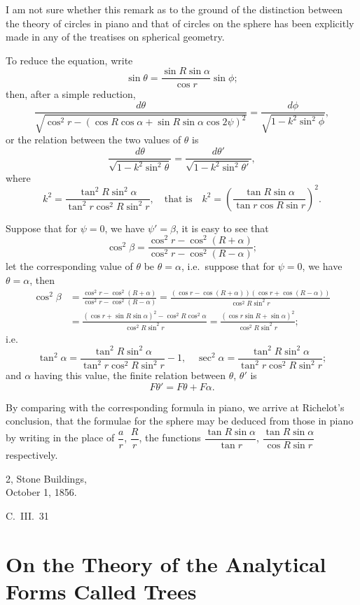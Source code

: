 \documentclass[11pt,a4paper]{article}
\theoremstyle{plain}
\begin{document}
I am not sure whether this remark as to the ground of the distinction between the theory of circles in piano and that of circles on the sphere has been explicitly made in any of the treatises on spherical geometry.

To reduce the equation, write
\[
\sin\theta = \frac{\sin R \sin\alpha}{\cos r} \sin\phi;
\]
then, after a simple reduction,
\[
\frac{d\theta}{\sqrt{\cos^2 r - (\cos R \cos\alpha + \sin R \sin\alpha \cos 2\psi)^2}} = \frac{d\phi}{\sqrt{1 - k^2\sin^2\phi}},
\]
or the relation between the two values of $\theta$ is
\[
\frac{d\theta}{\sqrt{1 - k^2\sin^2\theta}} = \frac{d\theta'}{\sqrt{1 - k^2\sin^2\theta'}},
\]
where
\[
k^2 = \frac{\tan^2 R \sin^2\alpha}{\tan^2 r \cos^2 R \sin^2 r}, \quad \text{that is} \quad k^2 = \left(\frac{\tan R \sin\alpha}{\tan r \cos R \sin r}\right)^2.
\]

Suppose that for $\psi = 0$, we have $\psi' = \beta$, it is easy to see that
\[
\cos^2\beta = \frac{\cos^2 r - \cos^2(R+\alpha)}{\cos^2 r - \cos^2(R-\alpha)};
\]
let the corresponding value of $\theta$ be $\theta = \alpha$, i.e.\ suppose that for $\psi = 0$, we have $\theta = \alpha$, then
\begin{align*}
\cos^2\beta &= \frac{\cos^2 r - \cos^2(R+\alpha)}{\cos^2 r - \cos^2(R-\alpha)} = \frac{(\cos r - \cos(R+\alpha))(\cos r + \cos(R-\alpha))}{\cos^2 R \sin^2 r} \\
&= \frac{(\cos r + \sin R \sin\alpha)^2 - \cos^2 R \cos^2\alpha}{\cos^2 R \sin^2 r} = \frac{(\cos r \sin R + \sin\alpha)^2}{\cos^2 R \sin^2 r};
\end{align*}
i.e.
\[
\tan^2\alpha = \frac{\tan^2 R \sin^2\alpha}{\tan^2 r \cos^2 R \sin^2 r} - 1, \quad \sec^2\alpha = \frac{\tan^2 R \sin^2\alpha}{\tan^2 r \cos^2 R \sin^2 r};
\]
and $\alpha$ having this value, the finite relation between $\theta$, $\theta'$ is
\[
F\theta' = F\theta + F\alpha.
\]

By comparing with the corresponding formula in piano, we arrive at Richelot's conclusion, that the formulae for the sphere may be deduced from those in piano by writing in the place of $\dfrac{a}{r}$, $\dfrac{R}{r}$, the functions $\dfrac{\tan R \sin\alpha}{\tan r}$, $\dfrac{\tan R \sin\alpha}{\cos R \sin r}$ respectively.

\begin{flushright}
2, Stone Buildings,\\
October 1, 1856.
\end{flushright}
\hfill C.~III.~31
\newpage


\section{On the Theory of the Analytical Forms Called Trees}
\label{sec:203}
\end{document}
